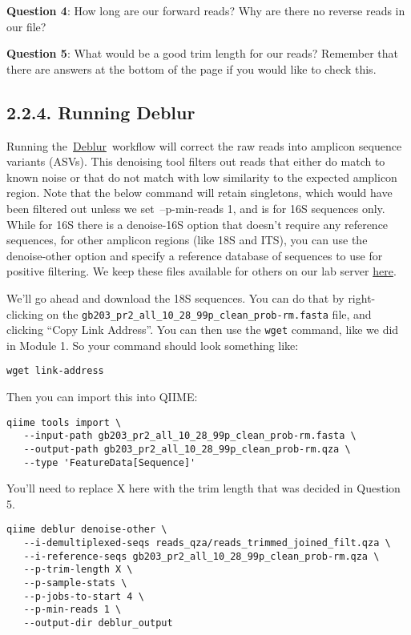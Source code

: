 \documentclass[
]{book}
\begin{document}
\textbf{Question 4}: How long are our forward reads? Why are there no reverse reads in our file?

\textbf{Question 5}: What would be a good trim length for our reads? Remember that there are answers at the bottom of the page if you would like to check this.

\subsection{2.2.4. Running Deblur}\label{running-deblur-1}

Running the~\href{https://github.com/biocore/deblur}{Deblur}~workflow will correct the raw reads into amplicon sequence variants (ASVs). This denoising tool filters out reads that either do match to known noise or that do not match with low similarity to the expected amplicon region. Note that the below command will retain singletons, which would have been filtered out unless we set~--p-min-reads 1, and is for 16S sequences only. While for 16S there is a denoise-16S option that doesn't require any reference sequences, for other amplicon regions (like 18S and ITS), you can use the denoise-other option and specify a reference database of sequences to use for positive filtering. We keep these files available for others on our lab server \href{http://kronos.pharmacology.dal.ca/public_files/MH/deblur_non16S_ref/}{here}.

We'll go ahead and download the 18S sequences. You can do that by right-clicking on the \texttt{gb203\_pr2\_all\_10\_28\_99p\_clean\_prob-rm.fasta} file, and clicking ``Copy Link Address''. You can then use the \texttt{wget} command, like we did in Module 1. So your command should look something like:

\begin{verbatim}
wget link-address
\end{verbatim}

Then you can import this into QIIME:

\begin{verbatim}
qiime tools import \
   --input-path gb203_pr2_all_10_28_99p_clean_prob-rm.fasta \
   --output-path gb203_pr2_all_10_28_99p_clean_prob-rm.qza \
   --type 'FeatureData[Sequence]'
\end{verbatim}

You'll need to replace X here with the trim length that was decided in Question 5.

\begin{verbatim}
qiime deblur denoise-other \
   --i-demultiplexed-seqs reads_qza/reads_trimmed_joined_filt.qza \
   --i-reference-seqs gb203_pr2_all_10_28_99p_clean_prob-rm.qza \
   --p-trim-length X \
   --p-sample-stats \
   --p-jobs-to-start 4 \
   --p-min-reads 1 \
   --output-dir deblur_output
\end{verbatim}
\end{document}
